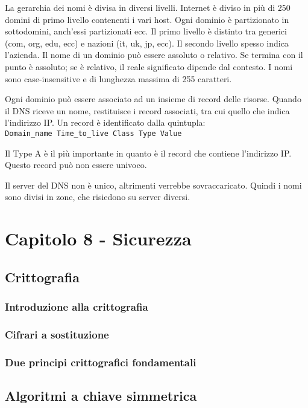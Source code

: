 La gerarchia dei nomi è divisa in diversi livelli. 
Internet è diviso in più di 250 domini di primo livello contenenti i vari host. 
Ogni dominio è partizionato in sottodomini, anch'essi partizionati ecc.
Il primo livello è distinto tra generici (com, org, edu, ecc) e nazioni (it, uk, jp, ecc).
Il secondo livello spesso indica l'azienda.
Il nome di un dominio può essere assoluto o relativo.
Se termina con il punto è assoluto; se è relativo, il reale significato dipende dal contesto.
I nomi sono case-insensitive e di lunghezza massima di 255 caratteri.

Ogni dominio può essere associato ad un insieme di record delle risorse.
Quando il DNS riceve un nome, restituisce i record associati, tra cui quello che indica l'indirizzo IP.
Un record è identificato dalla quintupla:\\
\texttt{Domain\_name Time\_to\_live Class Type Value}

Il Type A è il più importante in quanto è il record che contiene l'indirizzo IP. Questo record può non essere univoco.

Il server del DNS non è unico, altrimenti verrebbe sovraccaricato. Quindi i nomi sono divisi in zone, che risiedono su server diversi. 

\newpage
\section{Capitolo 8 - Sicurezza}

\subsection{Crittografia} %

\subsubsection{Introduzione alla crittografia}

\subsubsection{Cifrari a sostituzione}

\subsubsection{Due principi crittografici fondamentali}

\subsection{Algoritmi a chiave simmetrica} %

